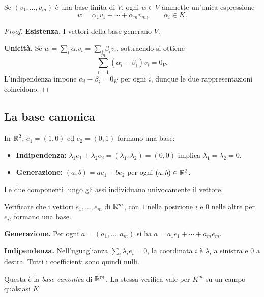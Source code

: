 \begin{proposizione}
Se $(v_1,\ldots,v_m)$ è una base finita di $V$, ogni $w\in V$ ammette un'unica espressione
\[
  w=\alpha_1v_1+\cdots+\alpha_mv_m,\qquad \alpha_i\in K.
\]
\end{proposizione}
\begin{proof}
\textbf{Esistenza.} I vettori della base generano $V$.

\textbf{Unicità.} Se $w=\sum_i\alpha_iv_i=\sum_i\beta_iv_i$, sottraendo si ottiene
\[
  \sum_{i=1}^m(\alpha_i-\beta_i)v_i=0_V.
\]
L'indipendenza impone $\alpha_i-\beta_i=0_K$ per ogni $i$, dunque le due rappresentazioni coincidono.
\end{proof}

\subsection{La base canonica}

\begin{esempio}
In $\mathbb{R}^2$, $e_1=(1,0)$ ed $e_2=(0,1)$ formano una base:
\begin{itemize}
  \item \textbf{Indipendenza:} $\lambda_1e_1+\lambda_2e_2=(\lambda_1,\lambda_2)=(0,0)$ implica $\lambda_1=\lambda_2=0$.
  \item \textbf{Generazione:} $(a,b)=ae_1+be_2$ per ogni $(a,b)\in\mathbb{R}^2$.
\end{itemize}
\end{esempio}
\begin{schema}

Le due componenti lungo gli assi individuano univocamente il vettore.
\end{schema}

\begin{esercizio}
Verificare che i vettori $e_1,\ldots,e_m$ di $\mathbb{R}^m$, con $1$ nella posizione $i$ e $0$ nelle altre per $e_i$, formano una base.
\end{esercizio}
\begin{svolgimento}
\textbf{Generazione.} Per ogni $a=(a_1,\ldots,a_m)$ si ha $a=a_1e_1+\cdots+a_me_m$.

\textbf{Indipendenza.} Nell'uguaglianza $\sum_i\lambda_ie_i=0$, la coordinata $i$ è $\lambda_i$ a sinistra e $0$ a destra. Tutti i coefficienti sono quindi nulli.
\end{svolgimento}
Questa è la \emph{base canonica} di $\mathbb{R}^m$. La stessa verifica vale per $K^m$ su un campo qualsiasi $K$.

